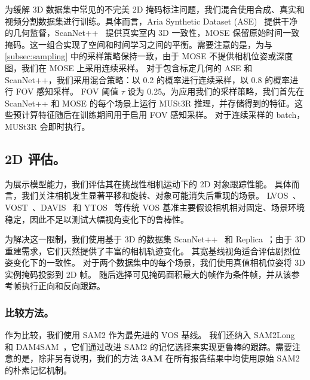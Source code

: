 为缓解 3D 数据集中常见的不完美 2D 掩码标注问题，我们混合使用合成、真实和视频分割数据集进行训练。具体而言，Aria Synthetic Dataset (ASE)~\cite{avetisyan2024scenescript} 提供干净的几何监督，ScanNet++~\cite{yeshwanth2023scannet++} 提供真实室内 3D 一致性，MOSE\cite{MOSE} 保留原始时间一致掩码。这一组合实现了空间和时间学习之间的平衡。需要注意的是，为与 \cref{subsec:sampling} 中的采样策略保持一致，由于 MOSE 不提供相机位姿或深度图，我们在 MOSE 上采用连续采样。
对于包含标定几何的 ASE 和 ScanNet++，我们采用混合策略：以 0.2 的概率进行连续采样，以 0.8 的概率进行 FOV 感知采样。
FOV 阈值 $\tau$ 设为 0.25。为应用我们的采样策略，我们首先在 ScanNet++ 和 MOSE 的每个场景上运行 MUSt3R 推理，并存储得到的特征。这些预计算特征随后在训练期间用于启用 FOV 感知采样。
对于连续采样的 batch，MUSt3R 会即时执行。  



\vspace{-0.5em}
\subsection{2D 评估。}
\vspace{-0.5em}

为展示模型能力，我们评估其在挑战性相机运动下的 2D 对象跟踪性能。
具体而言，我们关注相机发生显著平移和旋转、对象可能消失后重现的场景。
LVOS~\cite{hong2023lvos}、VOST~\cite{tokmakov2023vost}、DAVIS~\cite{perazzi2017davis} 和 YTOS~\cite{xu2018youtube} 等传统 VOS 基准主要假设相机相对固定、场景环境稳定，因此不足以测试大幅视角变化下的鲁棒性。

为解决这一限制，我们使用基于 3D 的数据集 ScanNet++~\cite{yeshwanth2023scannet++} 和 Replica~\cite{replica19arxiv}；由于 3D 重建需求，它们天然提供了丰富的相机轨迹变化。
其宽基线视角适合评估剧烈位姿变化下的一致性。
对于两个数据集中的每个场景，我们使用真值相机位姿将 3D 实例掩码投影到 2D 帧。
随后选择可见掩码面积最大的帧作为条件帧，并从该参考帧执行正向和反向跟踪。

\vspace{-1em}
\subsubsection{比较方法。}
作为比较，我们使用 SAM2 作为最先进的 VOS 基线。
我们还纳入 SAM2Long~\cite{ding2024sam2long} 和 DAM4SAM~\cite{videnovic2025distractor}，它们通过改进 SAM2 的记忆选择来实现更鲁棒的跟踪。需要注意的是，除非另有说明，我们的方法 \textbf{3AM} 在所有报告结果中均使用原始 SAM2 的朴素记忆机制。

\vspace{-1em}
